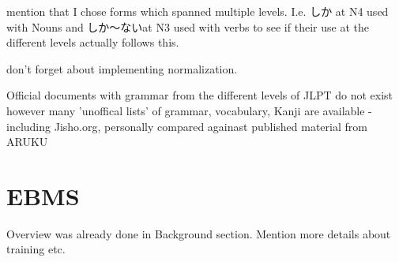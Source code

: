 mention that I chose forms which spanned multiple levels. I.e. しか at N4 used with Nouns and しか〜ないat N3 used
with verbs to see if their use at the different levels actually follows this.

don't forget about implementing normalization.

Official documents with grammar from the different levels of JLPT do not exist however many 'unoffical lists' of
grammar, vocabulary, Kanji are available - including Jisho.org, personally compared againast published material from
ARUKU

\section{EBMS}
 Overview was already done in Background section. Mention more details about training etc.


